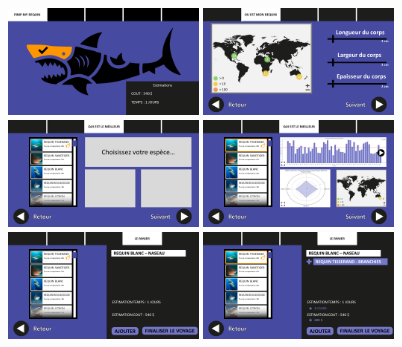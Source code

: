 \documentclass{article}
\begin{document}
\newpage
\begin{figure}[!h]

	\centering
	\includegraphics[width=0.45\textwidth]{assets/prototype/haute/Diapositive17}
	\hfill
	\includegraphics[width=0.45\textwidth]{assets/prototype/haute/Diapositive18}
	\includegraphics[width=0.45\textwidth]{assets/prototype/haute/Diapositive19}
	\hfill
	\includegraphics[width=0.45\textwidth]{assets/prototype/haute/Diapositive20}
	\includegraphics[width=0.45\textwidth]{assets/prototype/haute/Diapositive21}
	\hfill
	\includegraphics[width=0.45\textwidth]{assets/prototype/haute/Diapositive22}

\end{figure}
\end{document}
